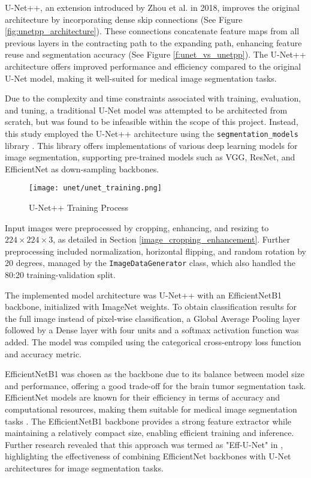 U-Net++, an extension introduced by Zhou et al. in 2018, improves the original architecture by incorporating dense skip connections (See Figure \ref{fig:unetpp_architecture}). These connections concatenate feature maps from all previous layers in the contracting path to the expanding path, enhancing feature reuse and segmentation accuracy \cite{zhou_unet_2018, zhou2019unetplusplus, zhou2018unetplusplus, zhou2021towards} (See Figure \ref{f:unet_vs_unetpp}). The U-Net++ architecture offers improved performance and efficiency compared to the original U-Net model, making it well-suited for medical image segmentation tasks.

Due to the complexity and time constraints associated with training, evaluation, and tuning, a traditional U-Net model was attempted to be architected from scratch, but was found to be infeasible within the scope of this project. Instead, this study employed the U-Net++ architecture using the \texttt{segmentation\_models} library \cite{Yakubovskiy_2019}. This library offers implementations of various deep learning models for image segmentation, supporting pre-trained models such as VGG, ResNet, and EfficientNet as down-sampling backbones.

\begin{figure}[H]
  \begin{center}
    \texttt{[image: unet/unet\_training.png]}
  \end{center}
  \caption{U-Net++ Training Process}\label{f:unet_training}
\end{figure}

Input images were preprocessed by cropping, enhancing, and resizing to $224 \times 224 \times 3$, as detailed in Section \ref{image_cropping_enhancement}. Further preprocessing included normalization, horizontal flipping, and random rotation by 20 degrees, managed by the \texttt{ImageDataGenerator} class, which also handled the 80:20 training-validation split.

The implemented model architecture was U-Net++ with an EfficientNetB1 backbone, initialized with ImageNet weights. To obtain classification results for the full image instead of pixel-wise classification, a Global Average Pooling layer followed by a Dense layer with four units and a softmax activation function was added. The model was compiled using the categorical cross-entropy loss function and accuracy metric.

EfficientNetB1 was chosen as the backbone due to its balance between model size and performance, offering a good trade-off for the brain tumor segmentation task. EfficientNet models are known for their efficiency in terms of accuracy and computational resources, making them suitable for medical image segmentation tasks \cite{hastomo_classification_2024}. The EfficientNetB1 backbone provides a strong feature extractor while maintaining a relatively compact size, enabling efficient training and inference. Further research revealed that this approach was termed as "Eff-U-Net" in \cite{baheti_eff-unet_2020}, highlighting the effectiveness of combining EfficientNet backbones with U-Net architectures for image segmentation tasks.

